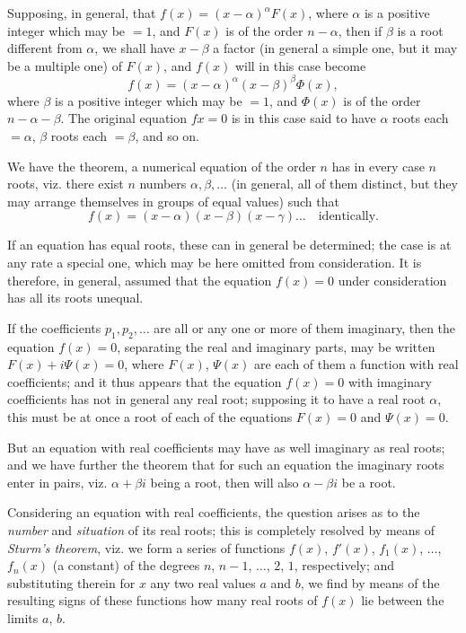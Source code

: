 \documentclass[12pt,a4paper]{article}
\theoremstyle{plain}
\theoremstyle{definition}
\theoremstyle{remark}
\begin{document}
Supposing, in general, that $f(x) = (x-\alpha)^\alpha F(x)$, where $\alpha$ is a positive integer which may be $=1$, and $F(x)$ is of the order $n-\alpha$, then if $\beta$ is a root different from $\alpha$, we shall have $x - \beta$ a factor (in general a simple one, but it may be a multiple one) of $F(x)$, and $f(x)$ will in this case become
\[
f(x) = (x-\alpha)^\alpha (x-\beta)^\beta \Phi(x),
\]
where $\beta$ is a positive integer which may be $=1$, and $\Phi(x)$ is of the order $n - \alpha - \beta$. The original equation $fx = 0$ is in this case said to have $\alpha$ roots each $= \alpha$, $\beta$ roots each $= \beta$, and so on.

We have the theorem, a numerical equation of the order $n$ has in every case $n$ roots, viz. there exist $n$ numbers $\alpha, \beta, \ldots$ (in general, all of them distinct, but they may arrange themselves in groups of equal values) such that
\[
f(x) = (x-\alpha)(x-\beta)(x-\gamma)\ldots \quad \text{identically}.
\]

If an equation has equal roots, these can in general be determined; the case is at any rate a special one, which may be here omitted from consideration. It is therefore, in general, assumed that the equation $f(x) = 0$ under consideration has all its roots unequal.

If the coefficients $p_1, p_2, \ldots$ are all or any one or more of them imaginary, then the equation $f(x) = 0$, separating the real and imaginary parts, may be written $F(x) + i\Psi(x) = 0$, where $F(x)$, $\Psi(x)$ are each of them a function with real coefficients; and it thus appears that the equation $f(x) = 0$ with imaginary coefficients has not in general any real root; supposing it to have a real root $\alpha$, this must be at once a root of each of the equations $F(x) = 0$ and $\Psi(x) = 0$.

But an equation with real coefficients may have as well imaginary as real roots; and we have further the theorem that for such an equation the imaginary roots enter in pairs, viz. $\alpha + \beta i$ being a root, then will also $\alpha - \beta i$ be a root.

Considering an equation with real coefficients, the question arises as to the \textit{number} and \textit{situation} of its real roots; this is completely resolved by means of \textit{Sturm's theorem}, viz. we form a series of functions $f(x)$, $f'(x)$, $f_1(x)$, $\ldots$, $f_n(x)$ (a constant) of the degrees $n$, $n-1$, $\ldots$, $2$, $1$, respectively; and substituting therein for $x$ any two real values $a$ and $b$, we find by means of the resulting signs of these functions how many real roots of $f(x)$ lie between the limits $a$, $b$.
\end{document}
